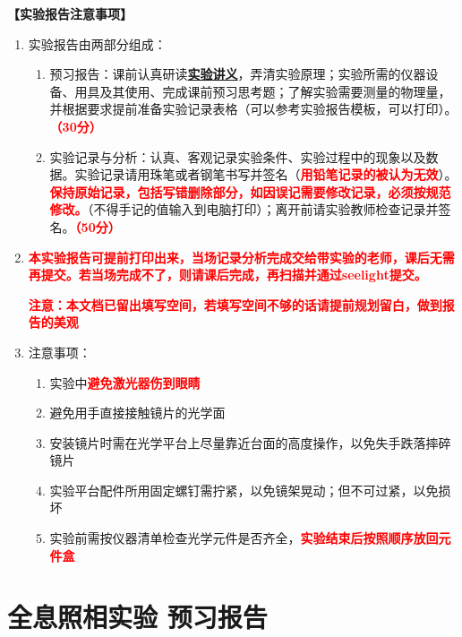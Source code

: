 \documentclass[dvipsnames, svgnames,a4paper,11pt]{article}
\begin{document}
	\textbf{【实验报告注意事项】}
	\begin{enumerate}[label=\arabic*., leftmargin=*]
		\item 实验报告由两部分组成：
			\begin{enumerate}[label=\arabic*), leftmargin=*]
				\item 预习报告：课前认真研读\underline{\textbf{实验讲义}}，弄清实验原理；实验所需的仪器设备、用具及其使用、完成课前预习思考题；了解实验需要测量的物理量，并根据要求提前准备实验记录表格（可以参考实验报告模板，可以打印）。\textcolor{red}{\textbf{（30分）}}
				\item 实验记录与分析：认真、客观记录实验条件、实验过程中的现象以及数据。实验记录请用珠笔或者钢笔书写并签名（\textcolor{red}{\textbf{用铅笔记录的被认为无效}}）。\textcolor{red}{\textbf{保持原始记录，包括写错删除部分，如因误记需要修改记录，必须按规范修改。}}（不得手记的值输入到电脑打印）；离开前请实验教师检查记录并签名。\textcolor{red}{\textbf{（50分）}}
			\end{enumerate}
		
		\item \textcolor{red}{\textbf{本实验报告可提前打印出来，当场记录分析完成交给带实验的老师，课后无需再提交。若当场完成不了，则请课后完成，再扫描并通过seelight提交。}}
		
		\textcolor{red}{\textbf{注意：本文档已留出填写空间，若填写空间不够的话请提前规划留白，做到报告的美观}}
		\item 注意事项：
			\begin{enumerate}[label=\arabic*), leftmargin=*]
				\item 实验中\textcolor{red}{\textbf{避免激光器伤到眼睛}}
				\item 避免用手直接接触镜片的光学面
				\item 安装镜片时需在光学平台上尽量靠近台面的高度操作，以免失手跌落摔碎镜片
				\item 实验平台配件所用固定螺钉需拧紧，以免镜架晃动；但不可过紧，以免损坏
				\item 实验前需按仪器清单检查光学元件是否齐全，\textcolor{red}{\textbf{实验结束后按照顺序放回元件盒}}
				
			\end{enumerate}
	\end{enumerate}
	
	
	\clearpage
	\tableofcontents
	\clearpage
	
	\setcounter{section}{0}
	\section{全息照相实验 \quad\heiti 预习报告}
		
\end{document}
